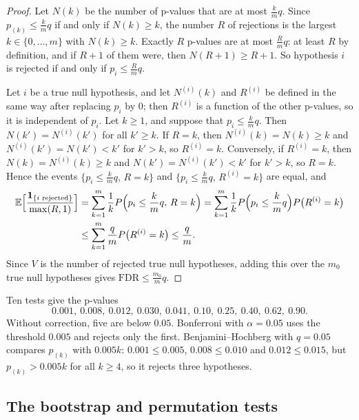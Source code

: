 \begin{proof}
    Let $N(k)$ be the number of p-values that are at most $\frac{k}{m}q$. Since $p_{(k)} \leq \frac{k}{m}q$ if and only if $N(k) \geq k$, the number $R$ of rejections is the largest $k \in \{0, \ldots, m\}$ with $N(k) \geq k$. Exactly $R$ p-values are at most $\frac{R}{m}q$: at least $R$ by definition, and if $R + 1$ of them were, then $N(R + 1) \geq R + 1$. So hypothesis $i$ is rejected if and only if $p_i \leq \frac{R}{m}q$.

    Let $i$ be a true null hypothesis, and let $N^{(i)}(k)$ and $R^{(i)}$ be defined in the same way after replacing $p_i$ by $0$; then $R^{(i)}$ is a function of the other p-values, so it is independent of $p_i$. Let $k \geq 1$, and suppose that $p_i \leq \frac{k}{m}q$. Then $N(k') = N^{(i)}(k')$ for all $k' \geq k$. If $R = k$, then $N^{(i)}(k) = N(k) \geq k$ and $N^{(i)}(k') = N(k') < k'$ for $k' > k$, so $R^{(i)} = k$. Conversely, if $R^{(i)} = k$, then $N(k) = N^{(i)}(k) \geq k$ and $N(k') = N^{(i)}(k') < k'$ for $k' > k$, so $R = k$. Hence the events $\{p_i \leq \frac{k}{m}q, \, R = k\}$ and $\{p_i \leq \frac{k}{m}q, \, R^{(i)} = k\}$ are equal, and
    \begin{align*}
        \mathbb{E}\Big[\frac{\mathbf{1}_{\{i \text{ rejected}\}}}{\max(R, 1)}\Big] &= \sum_{k=1}^m \frac{1}{k}P\Big(p_i \leq \frac{k}{m}q, \, R = k\Big) = \sum_{k=1}^m \frac{1}{k}P\Big(p_i \leq \frac{k}{m}q\Big)P\big(R^{(i)} = k\big) \\
        &\leq \sum_{k=1}^m \frac{q}{m}P\big(R^{(i)} = k\big) \leq \frac{q}{m}.
    \end{align*}
    Since $V$ is the number of rejected true null hypotheses, adding this over the $m_0$ true null hypotheses gives $\mathrm{FDR} \leq \frac{m_0}{m}q$.
\end{proof}

\begin{example}\label{L4-ex:multiple-testing}
    Ten tests give the p-values
    \[0.001, \ 0.008, \ 0.012, \ 0.030, \ 0.041, \ 0.10, \ 0.25, \ 0.40, \ 0.62, \ 0.90.\]
    Without correction, five are below $0.05$. Bonferroni with $\alpha = 0.05$ uses the threshold $0.005$ and rejects only the first. Benjamini--Hochberg with $q = 0.05$ compares $p_{(k)}$ with $0.005k$: $0.001 \leq 0.005$, $0.008 \leq 0.010$ and $0.012 \leq 0.015$, but $p_{(k)} > 0.005k$ for all $k \geq 4$, so it rejects three hypotheses.
\end{example}

\subsection{The bootstrap and permutation tests}

